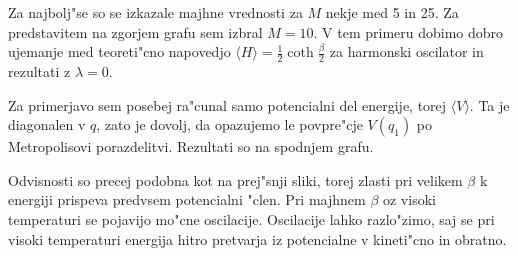 \documentclass[a4paper,10pt]{article}
\begin{document}
Za najbolj"se so se izkazale majhne vrednosti za $M$ nekje med 5 in 25. Za predstavitem na zgorjem grafu sem izbral $M=10$. 
V tem primeru dobimo dobro ujemanje med teoreti"cno napovedjo $\langle H \rangle = \frac{1}{2}\coth\frac{\beta}{2}$ za harmonski oscilator in rezultati z $\lambda = 0$. 

Za primerjavo sem posebej ra"cunal samo potencialni del energije, torej $\langle V \rangle$. 
Ta je diagonalen v $q$, zato je dovolj, da opazujemo le povpre"cje $V(q_1)$ po Metropolisovi porazdelitvi. 
Rezultati so na spodnjem grafu. 

\begin{figure}[H]
 \centering
 
\end{figure}

Odvisnosti so precej podobna kot na prej"snji sliki, torej zlasti pri velikem $\beta$ k energiji prispeva predvsem potencialni "clen. 
Pri majhnem $\beta$ oz visoki temperaturi se pojavijo mo"cne oscilacije. 
Oscilacije lahko razlo"zimo, saj se pri visoki temperaturi energija hitro pretvarja iz potencialne v kineti"cno in obratno. 
\end{document}
